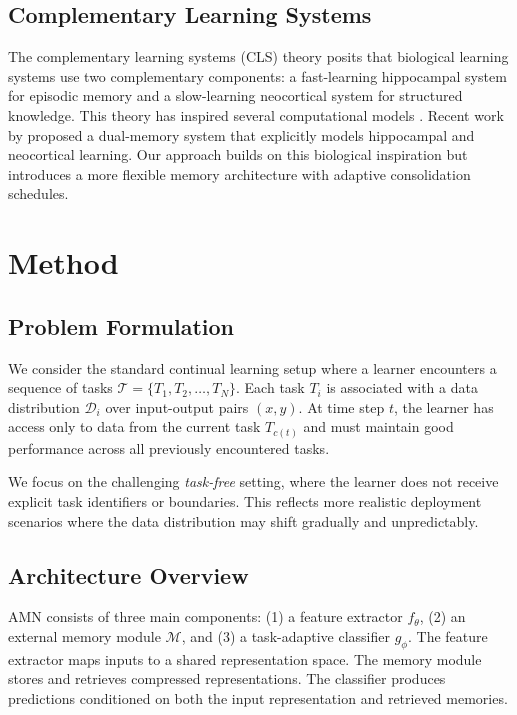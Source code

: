 \documentclass[11pt]{article}
\begin{document}
\subsection{Complementary Learning Systems}

The complementary learning systems (CLS) theory \citep{mcclelland1995there} posits that biological learning systems use two complementary components: a fast-learning hippocampal system for episodic memory and a slow-learning neocortical system for structured knowledge. This theory has inspired several computational models \citep{kumaran2016learning, zenke2017continual}. Recent work by \citet{arani2022learning} proposed a dual-memory system that explicitly models hippocampal and neocortical learning. Our approach builds on this biological inspiration but introduces a more flexible memory architecture with adaptive consolidation schedules.

\section{Method}
\label{sec:method}

\subsection{Problem Formulation}

We consider the standard continual learning setup where a learner encounters a sequence of tasks $\mathcal{T} = \{T_1, T_2, \ldots, T_N\}$. Each task $T_i$ is associated with a data distribution $\mathcal{D}_i$ over input-output pairs $(x, y)$. At time step $t$, the learner has access only to data from the current task $T_{c(t)}$ and must maintain good performance across all previously encountered tasks.

We focus on the challenging \emph{task-free} setting, where the learner does not receive explicit task identifiers or boundaries. This reflects more realistic deployment scenarios where the data distribution may shift gradually and unpredictably.

\subsection{Architecture Overview}

AMN consists of three main components: (1) a feature extractor $f_\theta$, (2) an external memory module $\mathcal{M}$, and (3) a task-adaptive classifier $g_\phi$. The feature extractor maps inputs to a shared representation space. The memory module stores and retrieves compressed representations. The classifier produces predictions conditioned on both the input representation and retrieved memories.
\end{document}
